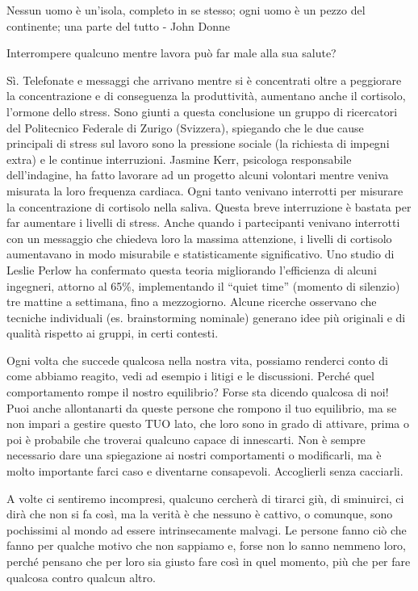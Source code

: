 \documentclass[12pt]{book} %
\begin{document}
Nessun uomo è un'isola, completo in se stesso; ogni uomo è un pezzo del continente; una parte del tutto - John Donne 

\begin{mdframed}[linewidth=1pt]
Interrompere qualcuno mentre lavora può far male alla sua salute?

Sì. Telefonate e messaggi che arrivano mentre si è concentrati oltre a peggiorare la concentrazione e di conseguenza la
produttività, aumentano anche il cortisolo, l'ormone dello stress. Sono giunti a questa conclusione un gruppo di
ricercatori del Politecnico Federale di Zurigo (Svizzera), spiegando che le due cause principali di stress sul lavoro
sono la pressione sociale (la richiesta di impegni extra) e le continue interruzioni. Jasmine Kerr, psicologa
responsabile dell'indagine, ha fatto lavorare ad un progetto alcuni volontari mentre veniva misurata la loro frequenza
cardiaca. Ogni tanto venivano interrotti per misurare la concentrazione di cortisolo nella saliva. Questa breve
interruzione è bastata per far aumentare i livelli di stress. Anche quando i partecipanti venivano interrotti con un
messaggio che chiedeva loro la massima attenzione, i livelli di cortisolo aumentavano in modo misurabile e statisticamente significativo. Uno studio di Leslie
Perlow ha confermato questa teoria migliorando l'efficienza di alcuni ingegneri, attorno al 65\%, implementando il “quiet time” (momento di silenzio) tre mattine a settimana, fino a mezzogiorno. Alcune ricerche osservano che tecniche individuali (es. brainstorming nominale) generano idee più originali e di qualità rispetto ai gruppi, in certi contesti.
\end{mdframed}

Ogni volta che succede qualcosa nella nostra vita, possiamo
renderci conto di come abbiamo reagito, vedi ad esempio i litigi e le discussioni. Perché quel comportamento rompe il
nostro equilibrio? Forse sta dicendo qualcosa di noi! Puoi anche allontanarti da queste persone che rompono il tuo
equilibrio, ma se non impari a gestire questo TUO lato, che loro sono in grado di attivare, prima o poi è probabile che troverai qualcuno capace di innescarti. Non è sempre necessario dare una spiegazione ai nostri
comportamenti o modificarli, ma è molto importante farci caso e diventarne consapevoli. Accoglierli senza cacciarli.

A volte ci sentiremo incompresi, qualcuno cercherà di tirarci giù, di sminuirci, ci dirà che non si fa così, ma la
verità è che nessuno è cattivo, o comunque, sono pochissimi al mondo ad essere intrinsecamente malvagi. Le persone
fanno ciò che fanno per qualche motivo che non sappiamo e, forse non lo sanno nemmeno loro, perché pensano che per loro
sia giusto fare così in quel momento, più che per fare qualcosa contro qualcun altro.
\end{document}

